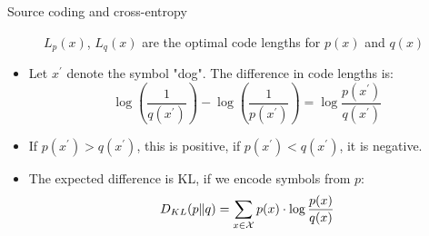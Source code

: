 \documentclass[11pt,compress,t,notes=noshow, xcolor=table]{beamer}
\begin{document}
\begin{vbframe} {Source coding and cross-entropy}
  \framebreak

  \begin{figure}
    \centering
      \caption{\footnotesize{$L_p(x)$, $L_q(x)$ are the optimal code lengths for $p(x)$ and $q(x)$}}
  \end{figure}
  
  \begin{itemize}
   \item Let $x^\prime$ denote the symbol "dog". The difference in code lengths is:
  $$ \log \left ( \frac{1}{q(x^\prime)} \right ) - \log \left( \frac{1}{p(x^\prime)} \right) = \log \frac{p(x^\prime)}{q(x^\prime)} $$
  
\item If $p(x^\prime) > q(x^\prime)$, this is positive, if $p(x^\prime) < q(x^\prime)$, it is negative. 
    \item The expected difference is KL, if we encode symbols from $p$:
  $$ D_{KL}(p \| q) = \sum_{x \in \mathcal{X}} p(x) \cdot \log \frac{p(x)}{q(x)} $$
  \end{itemize}

\end{vbframe}


\endlecture
\end{document}
